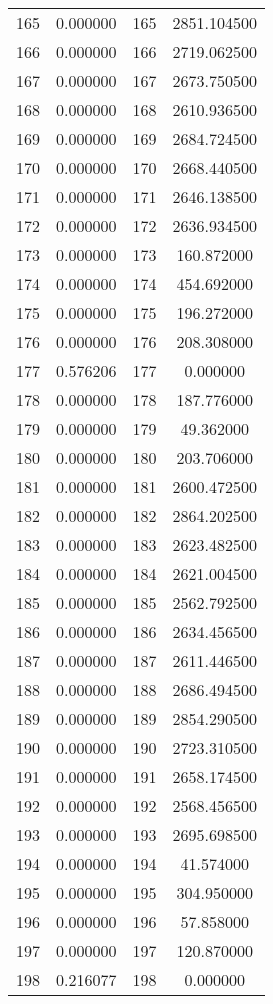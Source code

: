 \documentclass[12pt]{article}
\begin{document}
\begin{longtable}{@{}cccc@{}}
165 & 0.000000 & 165 & 2851.104500 \\
166 & 0.000000 & 166 & 2719.062500 \\
167 & 0.000000 & 167 & 2673.750500 \\
168 & 0.000000 & 168 & 2610.936500 \\
169 & 0.000000 & 169 & 2684.724500 \\
170 & 0.000000 & 170 & 2668.440500 \\
171 & 0.000000 & 171 & 2646.138500 \\
172 & 0.000000 & 172 & 2636.934500 \\
173 & 0.000000 & 173 & 160.872000 \\
174 & 0.000000 & 174 & 454.692000 \\
175 & 0.000000 & 175 & 196.272000 \\
176 & 0.000000 & 176 & 208.308000 \\
177 & 0.576206 & 177 & 0.000000 \\
178 & 0.000000 & 178 & 187.776000 \\
179 & 0.000000 & 179 & 49.362000 \\
180 & 0.000000 & 180 & 203.706000 \\
181 & 0.000000 & 181 & 2600.472500 \\
182 & 0.000000 & 182 & 2864.202500 \\
183 & 0.000000 & 183 & 2623.482500 \\
184 & 0.000000 & 184 & 2621.004500 \\
185 & 0.000000 & 185 & 2562.792500 \\
186 & 0.000000 & 186 & 2634.456500 \\
187 & 0.000000 & 187 & 2611.446500 \\
188 & 0.000000 & 188 & 2686.494500 \\
189 & 0.000000 & 189 & 2854.290500 \\
190 & 0.000000 & 190 & 2723.310500 \\
191 & 0.000000 & 191 & 2658.174500 \\
192 & 0.000000 & 192 & 2568.456500 \\
193 & 0.000000 & 193 & 2695.698500 \\
194 & 0.000000 & 194 & 41.574000 \\
195 & 0.000000 & 195 & 304.950000 \\
196 & 0.000000 & 196 & 57.858000 \\
197 & 0.000000 & 197 & 120.870000 \\
198 & 0.216077 & 198 & 0.000000 \\

\end{longtable}
\end{document}
